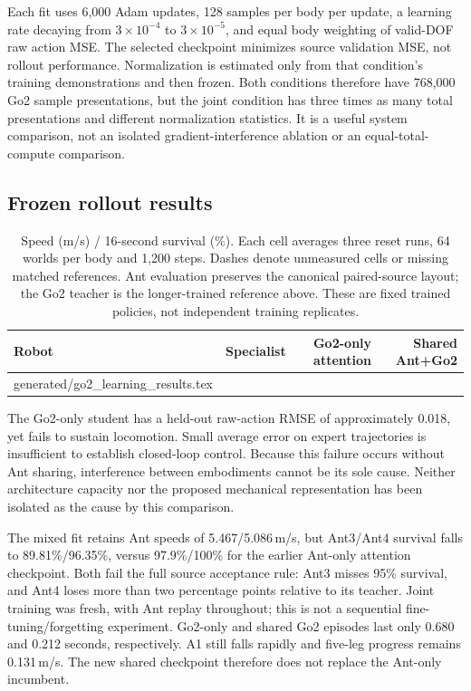 \documentclass[11pt,letterpaper]{article}
\makeatletter
\newcommand{\tableinput}[1]{\@@input #1 }
\makeatother
\begin{document}
Each fit uses 6,000 Adam updates, 128 samples per body per update, a learning rate
decaying from $3\times10^{-4}$ to $3\times10^{-5}$, and equal body weighting of
valid-DOF raw action MSE. The selected checkpoint minimizes source validation
MSE, not rollout performance. Normalization is estimated only from that
condition's training demonstrations and then frozen. Both conditions therefore
have 768,000 Go2 sample presentations, but the joint condition has three times
as many total presentations and different normalization statistics. It is a
useful system comparison, not an isolated gradient-interference ablation or an
equal-total-compute comparison.

\subsection{Frozen rollout results}
\begin{table}[htbp]
\centering\small
\begin{tabular}{@{}lrrr@{}}
\toprule
Robot & Specialist & Go2-only attention & Shared Ant+Go2\\
\midrule
\tableinput{generated/go2_learning_results.tex}
\bottomrule
\end{tabular}
\caption{Speed (m/s) / 16-second survival (\%). Each cell averages three
reset runs, 64 worlds per body and 1,200 steps. Dashes denote unmeasured cells or
missing matched references. Ant evaluation preserves the canonical paired-source
layout; the Go2 teacher is the longer-trained reference above. These are fixed
trained policies, not independent training replicates.}
\label{tab:go2learning}
\end{table}

The Go2-only student has a held-out raw-action RMSE of approximately 0.018,
yet fails to sustain locomotion. Small average error on expert trajectories is
insufficient to establish closed-loop control. Because this failure occurs
without Ant sharing, interference between embodiments cannot be its sole cause.
Neither architecture capacity nor the proposed mechanical representation has
been isolated as the cause by this comparison.

The mixed fit retains Ant speeds of 5.467/5.086\,m/s, but Ant3/Ant4 survival falls
to 89.81\%/96.35\%, versus 97.9\%/100\% for the earlier Ant-only attention
checkpoint. Both fail the full source acceptance rule: Ant3 misses 95\%
survival, and Ant4 loses more than two percentage points relative to its teacher.
Joint training was fresh, with Ant replay throughout; this is not a sequential
fine-tuning/forgetting experiment. Go2-only and shared Go2 episodes last only
0.680 and 0.212 seconds, respectively. A1 still falls rapidly and five-leg
progress remains 0.131\,m/s. The new shared checkpoint therefore does not replace
the Ant-only incumbent.
\end{document}
